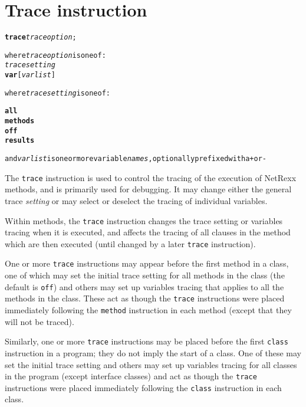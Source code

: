 \chapter{Trace instruction}\label{"id"}
\index{,}
\index{,}
\begin{shaded}
\begin{alltt}
\textbf{trace} \emph{traceoption};

where \emph{traceoption} is one of:
    \emph{tracesetting}
    \textbf{var} [\emph{varlist}]

where \emph{tracesetting} is one of:

    \textbf{all}
    \textbf{methods}
    \textbf{off}
    \textbf{results}

and \emph{varlist} is one or more variable \emph{names}, optionally prefixed with a \texttt{+} or \texttt{-}
\end{alltt}
\end{shaded}
 The \texttt{trace} instruction is used to control the tracing of the
execution of NetRexx methods, and is primarily used for debugging.
It may change either the general trace \emph{setting} or may select
or deselect the tracing of individual variables.
 
Within methods, the \texttt{trace} instruction changes the trace setting
or variables tracing when it is executed, and affects the tracing of
all clauses in the method which are then executed (until changed by a
later \texttt{trace} instruction).
 
One or more \texttt{trace} instructions may appear before the first
method in a class, one of which may set the initial trace setting
for all methods in the class (the default is \texttt{off}) and others
may set up variables tracing that applies to all the methods in the
class.
These act as though the \texttt{trace} instructions were
placed immediately following the \texttt{method} instruction in each
method (except that they will not be traced).
 
Similarly, one or more \texttt{trace} instructions may be placed
before the first \texttt{class} instruction in a program; they do not
imply the start of a class.  One of these may set the initial trace
setting and others may set up variables tracing for all classes in
the program (except interface classes) and act as though the
\texttt{trace} instructions were placed immediately following the
\texttt{class} instruction in each class.

